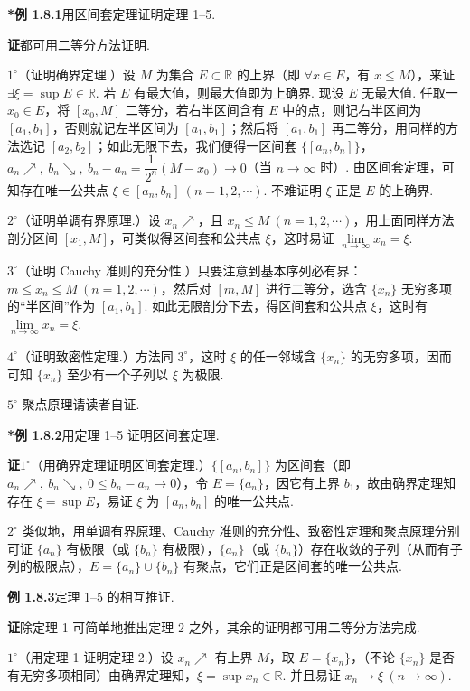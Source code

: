 \documentclass[UTF8, 12pt, fontset=fandol, oneside]{ctexart}
\begin{document}
\noindent\textbf{*例 1.8.1}\quad 用区间套定理证明定理 1--5.

\noindent\textbf{证}\quad 都可用二等分方法证明.

$1^\circ$（证明确界定理.）设 $M$ 为集合 $E\subset\mathbb{R}$ 的上界（即 $\forall x\in E$，有 $x\le M$），来证 $\exists\xi=\sup E\in\mathbb{R}$. 若 $E$ 有最大值，则最大值即为上确界. 现设 $E$ 无最大值. 任取一 $x_0\in E$，将 $[x_0,M]$ 二等分，若右半区间含有 $E$ 中的点，则记右半区间为 $[a_1,b_1]$，否则就记左半区间为 $[a_1,b_1]$；然后将 $[a_1,b_1]$ 再二等分，用同样的方法选记 $[a_2,b_2]$；如此无限下去，我们便得一区间套 $\{[a_n,b_n]\}$，$a_n\nearrow,\ b_n\searrow,\ b_n-a_n=\dfrac1{2^n}(M-x_0)\to0$（当 $n\to\infty$ 时）. 由区间套定理，可知存在唯一公共点 $\xi\in[a_n,b_n]\ (n=1,2,\cdots)$. 不难证明 $\xi$ 正是 $E$ 的上确界.

$2^\circ$（证明单调有界原理.）设 $x_n\nearrow$，且 $x_n\le M\ (n=1,2,\cdots)$，用上面同样方法剖分区间 $[x_1,M]$，可类似得区间套和公共点 $\xi$，这时易证 $\lim\limits_{n\to\infty}x_n=\xi$.

$3^\circ$（证明 Cauchy 准则的充分性.）只要注意到基本序列必有界：$m\le x_n\le M\ (n=1,2,\cdots)$，然后对 $[m,M]$ 进行二等分，选含 $\{x_n\}$ 无穷多项的“半区间”作为 $[a_1,b_1]$. 如此无限剖分下去，得区间套和公共点 $\xi$，这时有 $\lim\limits_{n\to\infty}x_n=\xi$.

$4^\circ$（证明致密性定理.）方法同 $3^\circ$，这时 $\xi$ 的任一邻域含 $\{x_n\}$ 的无穷多项，因而可知 $\{x_n\}$ 至少有一个子列以 $\xi$ 为极限.

$5^\circ$ 聚点原理请读者自证.

\noindent\textbf{*例 1.8.2}\quad 用定理 1--5 证明区间套定理.

\noindent\textbf{证}\quad $1^\circ$（用确界定理证明区间套定理.）$\{[a_n,b_n]\}$ 为区间套（即 $a_n\nearrow,\ b_n\searrow,\ 0\le b_n-a_n\to0$），令 $E=\{a_n\}$，因它有上界 $b_1$，故由确界定理知存在 $\xi=\sup E$，易证 $\xi$ 为 $[a_n,b_n]$ 的唯一公共点.

$2^\circ$ 类似地，用单调有界原理、Cauchy 准则的充分性、致密性定理和聚点原理分别可证 $\{a_n\}$ 有极限（或 $\{b_n\}$ 有极限），$\{a_n\}$（或 $\{b_n\}$）存在收敛的子列（从而有子列的极限点），$E=\{a_n\}\cup\{b_n\}$ 有聚点，它们正是区间套的唯一公共点.

\noindent\textbf{例 1.8.3}\quad 定理 1--5 的相互推证.

\noindent\textbf{证}\quad 除定理 1 可简单地推出定理 2 之外，其余的证明都可用二等分方法完成.

$1^\circ$（用定理 1 证明定理 2.）设 $x_n\nearrow$ 有上界 $M$，取 $E=\{x_n\}$，（不论 $\{x_n\}$ 是否有无穷多项相同）由确界定理知，$\xi=\sup x_n\in\mathbb{R}$. 并且易证 $x_n\to\xi\ (n\to\infty)$.
\end{document}
